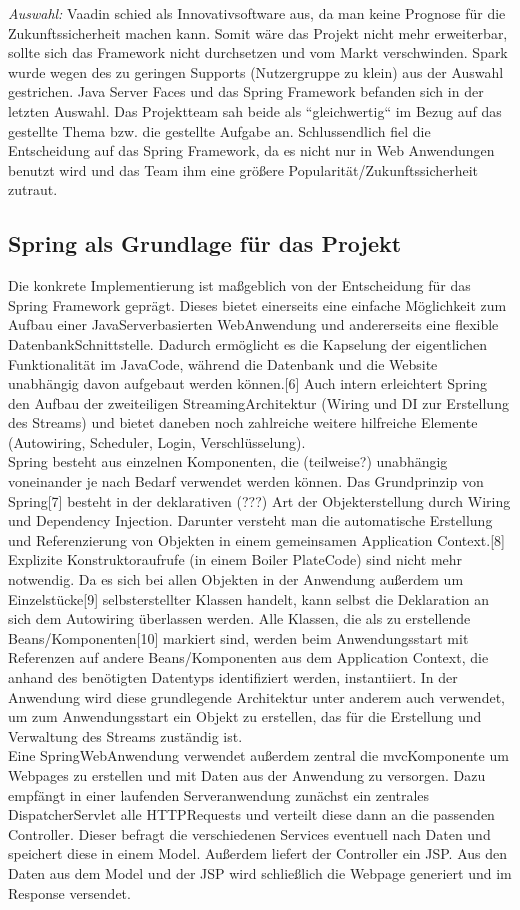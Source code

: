 \textit{Auswahl:} Vaadin schied als Innovativsoftware aus, da man keine Prognose für die Zukunftssicherheit machen kann. Somit wäre das Projekt nicht mehr erweiterbar, sollte sich das Framework nicht durchsetzen und vom Markt verschwinden. Spark wurde wegen des zu geringen Supports (Nutzergruppe zu klein) aus der Auswahl gestrichen. Java Server Faces und das Spring Framework befanden sich in der letzten Auswahl. Das Projektteam sah beide als “gleichwertig“ im Bezug auf das gestellte Thema bzw. die gestellte Aufgabe an. Schlussendlich fiel die Entscheidung auf das Spring Framework, da es nicht nur in Web Anwendungen benutzt wird und das Team ihm eine größere Popularität/Zukunftssicherheit zutraut.

\subsection{Spring als Grundlage für das Projekt}

Die konkrete Implementierung ist maßgeblich von der Entscheidung für das Spring Framework
geprägt. Dieses bietet einerseits eine einfache Möglichkeit zum Aufbau einer Java­Server­basierten
Web­Anwendung und andererseits eine flexible Datenbank­Schnittstelle. Dadurch ermöglicht es
die Kapselung der eigentlichen Funktionalität im Java­Code, während die Datenbank und die
Website unabhängig davon aufgebaut werden können.[6] Auch intern erleichtert Spring den
Aufbau der zweiteiligen Streaming­Architektur (Wiring und DI zur Erstellung des Streams) und
bietet daneben noch zahlreiche weitere hilfreiche Elemente (Autowiring, Scheduler, Login,
Verschlüsselung). \\
Spring besteht aus einzelnen Komponenten, die (teilweise?) unabhängig voneinander je nach
Bedarf verwendet werden können.
Das Grundprinzip von Spring[7] besteht in der deklarativen (???) Art der Objekterstellung durch
Wiring und Dependency Injection. Darunter versteht man die automatische Erstellung und
Referenzierung von Objekten in einem gemeinsamen Application Context.[8] Explizite
Konstruktoraufrufe (in einem Boiler Plate­Code) sind nicht mehr notwendig. Da es sich bei allen
Objekten in der Anwendung außerdem um Einzelstücke[9] selbsterstellter Klassen handelt, kann
selbst die Deklaration an sich dem Autowiring überlassen werden. Alle Klassen, die als zu
erstellende Beans/Komponenten[10] markiert sind, werden beim Anwendungsstart mit Referenzen
auf andere Beans/Komponenten aus dem Application Context, die anhand des benötigten
Datentyps identifiziert werden, instantiiert.
In der Anwendung wird diese grundlegende Architektur unter anderem auch verwendet, um zum
Anwendungsstart ein Objekt zu erstellen, das für die Erstellung und Verwaltung des Streams
zuständig ist. \\
Eine Spring­Web­Anwendung verwendet außerdem zentral die mvc­Komponente um Webpages zu
erstellen und mit Daten aus der Anwendung zu versorgen. Dazu empfängt in einer laufenden
Serveranwendung zunächst ein zentrales DispatcherServlet alle HTTP­Requests und verteilt diese
dann an die passenden Controller. Dieser befragt die verschiedenen Services eventuell nach
Daten und speichert diese in einem Model. Außerdem liefert der Controller ein JSP. Aus den
Daten aus dem Model und der JSP wird schließlich die Webpage generiert und im Response
versendet.
